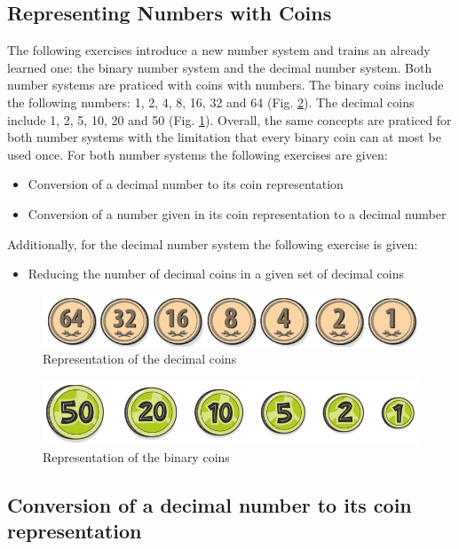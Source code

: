 \subsection{Representing Numbers with Coins}

The following exercises introduce a new number system and trains an already learned one: the binary number system and the decimal number system. Both number systems are praticed with coins with numbers. The binary coins include the following numbers: 1, 2, 4, 8, 16, 32 and 64 (Fig. \ref{fig:binary_coins}). The decimal coins include 1, 2, 5, 10, 20 and 50 (Fig. \ref{fig:decimal_coins}). 
Overall, the same concepts are praticed for both number systems with the limitation that every binary coin can at most be used once. For both number systems the following exercises are given:
\begin{itemize}
    \item Conversion of a decimal number to its coin representation
    \item Conversion of a number given in its coin representation to a decimal number
\end{itemize}
Additionally, for the decimal number system the following exercise is given:
\begin{itemize}
    \item Reducing the number of decimal coins in a given set of decimal coins
\end{itemize}

\begin{figure} 
    \centering
    \includegraphics[width=0.5 \columnwidth]{figures/decimal_coins.png}
    \caption{Representation of the decimal coins} 
    \label{fig:decimal_coins} 
\end{figure}

\begin{figure} 
    \centering
    \includegraphics[width=0.5 \columnwidth]{figures/binary_coins.png}
    \caption{Representation of the binary coins} 
    \label{fig:binary_coins} 
\end{figure}

\subsection*{Conversion of a decimal number to its coin representation}

